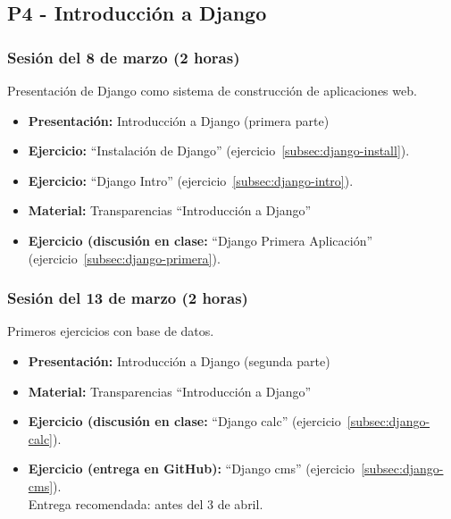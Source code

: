 \documentclass[a4paper,12pt]{article}
\begin{document}
\subsection{P4 - Introducción a Django}

\subsubsection{Sesión del 8 de marzo (2 horas)}

Presentación de Django como sistema de construcción de aplicaciones web.

\begin{itemize}
 \item \textbf{Presentación:} Introducción a Django (primera parte)
 \item \textbf{Ejercicio:} ``Instalación de Django'' (ejercicio~\ref{subsec:django-install}).
 \item \textbf{Ejercicio:} ``Django Intro'' (ejercicio~\ref{subsec:django-intro}).
 \item \textbf{Material:} Transparencias ``Introducción a Django''
 \item \textbf{Ejercicio (discusión en clase:} ``Django Primera Aplicación'' (ejercicio~\ref{subsec:django-primera}).
\end{itemize}

\subsubsection{Sesión del 13 de marzo (2 horas)}

Primeros ejercicios con base de datos.

\begin{itemize}
 \item \textbf{Presentación:} Introducción a Django (segunda parte)
 \item \textbf{Material:} Transparencias ``Introducción a Django''

  \item \textbf{Ejercicio (discusión en clase:} ``Django calc'' (ejercicio~\ref{subsec:django-calc}). \\
 \item \textbf{Ejercicio  (entrega en GitHub):} ``Django cms'' (ejercicio~\ref{subsec:django-cms}). \\
    Entrega recomendada: antes del 3 de abril.
 
\end{itemize}
\end{document}
